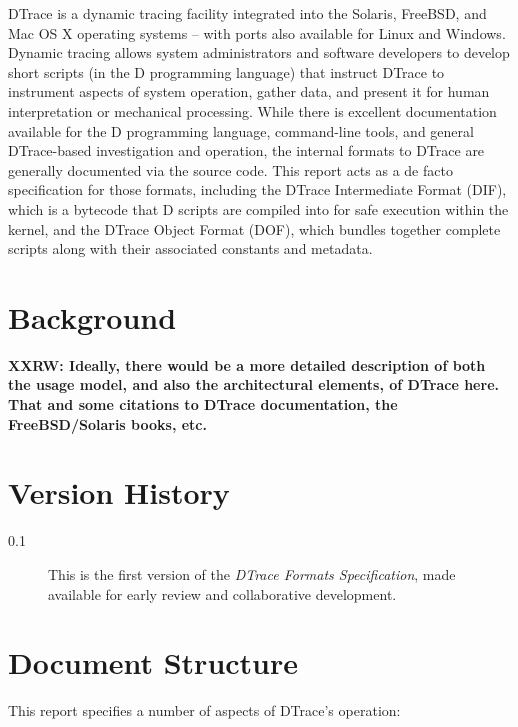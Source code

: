 DTrace is a dynamic tracing facility integrated into the Solaris, FreeBSD,
and Mac OS X operating systems -- with ports also available for Linux and
Windows.
Dynamic tracing allows system administrators and software developers to
develop short scripts (in the D programming language) that instruct DTrace to
instrument aspects of system operation, gather data, and present it for human
interpretation or mechanical processing.
While there is excellent documentation available for the D programming
language, command-line tools, and general DTrace-based investigation and
operation, the internal formats to DTrace are generally documented via the
source code.
This report acts as a de facto specification for those formats, including
the DTrace Intermediate Format (DIF), which is a bytecode that D scripts are
compiled into for safe execution within the kernel, and the DTrace Object
Format (DOF), which bundles together complete scripts along with their
associated constants and metadata.

\section{Background}

\textbf{XXRW: Ideally, there would be a more detailed description of both the
usage model, and also the architectural elements, of DTrace here.
That and some citations to DTrace documentation, the FreeBSD/Solaris books,
etc.}

\section{Version History}

\begin{description}
\item[0.1] This is the first version of the \textit{DTrace Formats
  Specification}, made available for early review and collaborative
  development.
\end{description}

\section{Document Structure}

This report specifies a number of aspects of DTrace's operation:

